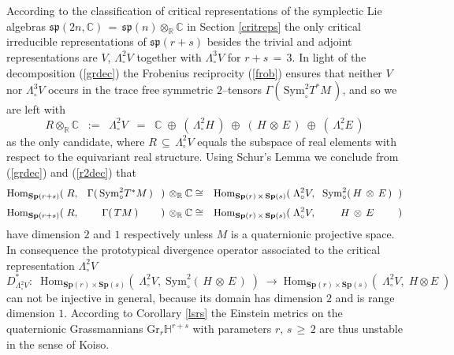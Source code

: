 \documentclass[12pt]{article}
\def\C{\mathbb{C}}
\def\Gr{\mathrm{Gr}}
\def\H{\mathbb{H}}
\def\Hom{\mathrm{Hom}}
\def\L{\Lambda}
\def\R{\mathbb{R}}
\def\S{\mathrm{Sym}}
\def\sp{\mathfrak{sp}}
\def\Sp{\mathbf{Sp}}
\begin{document}
 According to the classification of critical representations of the
 symplectic Lie algebras $\sp(2n,\C)\,=\,\sp(n)\otimes_\R\C$ in
 Section \ref{critreps} the only critical irreducible representations
 of $\sp(r+s)$ besides the trivial and adjoint representations are
 $V$, $\L^2_\circ V$ together with $\L^3_\circ V$ for $r+s\,=\,3$.
 In light of the decomposition (\ref{grdec}) the Frobenius reciprocity
 (\ref{frob}) ensures that neither $V$ nor $\L^3_\circ V$ occurs in the
 trace free symmetric $2$--tensors $\Gamma(\,\S^2_\circ T^*M\,)$, and
 so we are left with
 \begin{equation}\label{r2dec}
  R\otimes_\R\C
  \;\;:=\;\;
  \L^2_\circ V
  \;\;=\;\;
  \C\;\oplus\;(\,\L^2_\circ H\,)\;\oplus\;(\,H\,\otimes\,E\,)
  \;\oplus\;(\,\L^2_\circ E\,)
 \end{equation}
 as the only candidate, where $R\,\subseteq\,\L^2_\circ V$ equals the
 subspace of real elements with respect to the equivariant real structure.
 Using Schur's Lemma we conclude from (\ref{grdec}) and (\ref{r2dec}) that
 \begin{eqnarray*}
  \Hom_{\Sp(r+s)}(\;R,\;
  \hbox to74pt{\hfill$\Gamma(\,\S^2_\circ T^*M\,)$\hfill}\;)\,\otimes_\R\C
  &\cong&
  \Hom_{\Sp(r)\,\times\,\Sp(s)}(\;\L^2_\circ V,\;
  \hbox to74pt{\hfill$\S^2_\circ(\,H\,\otimes\,E\,)$\hfill}\;)
  \\[3pt]
  \Hom_{\Sp(r+s)}(\;R,\;
  \hbox to74pt{\hfill$\Gamma(\,TM\,)$\hfill}\;)\,\otimes_\R\C
  &\cong&
  \Hom_{\Sp(r)\,\times\,\Sp(s)}(\;\L^2_\circ V,\;
  \hbox to74pt{\hfill$H\,\otimes\,E$\hfill}\;)
 \end{eqnarray*}
 have dimension $2$ and $1$ respectively unless $M$ is a quaternionic
 projective space. In consequence the prototypical divergence operator
 associated to the critical representation $\L^2_\circ V$
 \begin{equation}\label{grproto}
  D^*_{\L^2_\circ V}:\;\;\Hom_{\Sp(r)\times\Sp(s)}
  (\;\L^2_\circ V,\;\S^2_\circ(\,H\,\otimes\,E\,)\;)
  \;\longrightarrow\;\Hom_{\Sp(r)\times\Sp(s)}(\;\L^2_\circ V,\;H\otimes E\;)
 \end{equation}
 can not be injective in general, because its domain has dimension $2$ and
 is range dimension $1$. According to Corollary \ref{lsrs} the Einstein
 metrics on the quaternionic Grassmannians $\Gr_r\H^{r+s}$ with parameters
 $r,\,s\,\geq\,2$ are thus unstable in the sense of Koiso.
\end{document}
